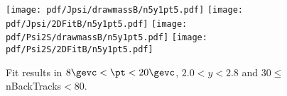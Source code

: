 \begin{figure}[H]
\begin{center}
\texttt{[image: pdf/Jpsi/drawmassB/n5y1pt5.pdf]}
\texttt{[image: pdf/Jpsi/2DFitB/n5y1pt5.pdf]}
\vspace*{-0.5cm}
\texttt{[image: pdf/Psi2S/drawmassB/n5y1pt5.pdf]}
\texttt{[image: pdf/Psi2S/2DFitB/n5y1pt5.pdf]}
\vspace*{-0.5cm}
\end{center}
\caption{Fit results in $8\gevc<\pt<20\gevc$, $2.0<y<2.8$ and 30$\leq$nBackTracks$<$80.}
\label{Fitn5y1pt5}
\end{figure}
